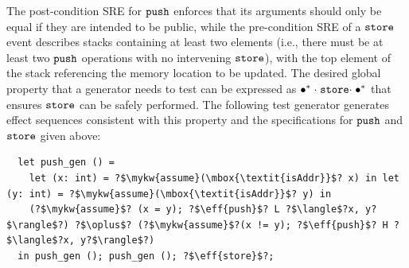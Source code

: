 \vspace{-.4cm} \par{}\vspace{-.5cm} \par\nobreak\noindent
The post-condition SRE for $\boldsymbol{{\tt push}}$ enforces that its arguments
should only be equal if they are intended to be public, while the
pre-condition SRE of a $\boldsymbol{{\tt store}}$ event describes stacks
containing at least two elements (i.e., there must be at least two
$\boldsymbol{{\tt push}}$ operations with no intervening $\boldsymbol{{\tt store}}$), with the
top element of the stack referencing the memory location to be
updated.
The desired global property that a generator needs to test can be expressed as ${\bullet^*}\;{\cdot}\;\boldsymbol{{\tt store}}{\cdot}\;{\bullet^*}$ that ensures $\boldsymbol{{\tt store}}$ can be safely performed.
The following test generator generates effect sequences consistent with
this property and the \tyName{} specifications for $\boldsymbol{{\tt push}}$ and $\boldsymbol{{\tt store}}$ given above:
\begin{verbatim}
  let push_gen () =
    let (x: int) = ?$\mykw{assume}(\mbox{\textit{isAddr}}$? x) in let (y: int) = ?$\mykw{assume}(\mbox{\textit{isAddr}}$? y) in
    (?$\mykw{assume}$? (x = y); ?$\eff{push}$? L ?$\langle$?x, y?$\rangle$?) ?$\oplus$? (?$\mykw{assume}$?(x != y); ?$\eff{push}$? H ?$\langle$?x, y?$\rangle$?)
  in push_gen (); push_gen (); ?$\eff{store}$?;
\end{verbatim}

